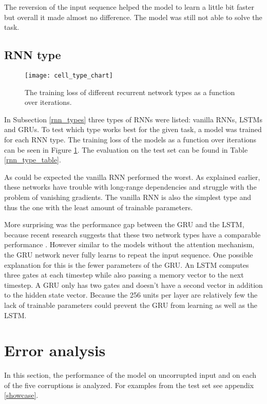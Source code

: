 The reversion of the input sequence helped the model to learn a little bit faster but overall it made almost no difference. The model was still not able to solve the task.

\subsection{RNN type}

\begin{figure}[p]
\centering
\texttt{[image: cell\_type\_chart]}
\caption{The training loss of different recurrent network types as a function over iterations.}
\label{cell_type_chart}
\end{figure}

In Subsection \ref{rnn_types} three types of RNNs were listed: vanilla RNNs, LSTMs and GRUs. To test which type works best for the given task, a model was trained for each RNN type. The training loss of the models as a function over iterations can be seen in Figure \ref{cell_type_chart}. The evaluation on the test set can be found in Table \ref{rnn_type_table}.

As could be expected the vanilla RNN performed the worst. As explained earlier, these networks have trouble with long-range dependencies and struggle with the problem of vanishing gradients. The vanilla RNN is also the simplest type and thus the one with the least amount of trainable parameters.

More surprising was the performance gap between the GRU and the LSTM, because recent research suggests that these two network types have a comparable performance \cite{lstm_vs_gru}. However similar to the models without the attention mechanism, the GRU network never fully learns to repeat the input sequence. One possible explanation for this is the fewer parameters of the GRU. An LSTM computes three gates at each timestep while also passing a memory vector to the next timestep. A GRU only has two gates and doesn't have a second vector in addition to the hidden state vector. Because the 256 units per layer are relatively few the lack of trainable parameters could prevent the GRU from learning as well as the LSTM.

\section{Error analysis}
\label{error_analysis}

In this section, the performance of the model on uncorrupted input and on each of the five corruptions is analyzed. For examples from the test set see appendix \ref{showcase}.


